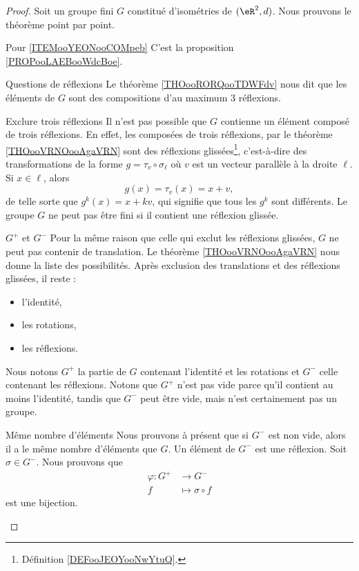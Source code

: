 \begin{proof}
	Soit un groupe fini \( G\) constitué d'isométries de \( (\eR^2,d)\). Nous prouvons le théorème point par point.
	\begin{subproof}
		\item[Pour \ref{ITEMooYEONooCOMpeb}]
		C'est la proposition \ref{PROPooLAEBooWdcBoe}.
		\item[Questions de réflexions]
		Le théorème \ref{THOooRORQooTDWFdv} nous dit que les éléments de \( G\) sont des compositions d'au maximum \( 3\) réflexions.
		\item[Exclure trois réflexions]
		Il n'est pas possible que \( G\) contienne un élément composé de trois réflexions. En effet, les composées de trois réflexions, par le théorème \ref{THOooVRNOooAgaVRN} sont des réflexions glissées\footnote{Définition \ref{DEFooJEOYooNwYtuQ}.}, c'est-à-dire des transformations de la forme \( g=\tau_v\circ \sigma_{\ell}\) où \( v\) est un vecteur parallèle à la droite \( \ell\). Si \( x\in \ell\), alors
		\begin{equation}
			g(x)=\tau_v(x)=x+v,
		\end{equation}
		de telle sorte que \( g^k(x)=x+kv\), qui signifie que tous les \( g^k\) sont différents. Le groupe \( G\) ne peut pas être fini si il contient une réflexion glissée.

		\item[\( G^+\) et \( G^-\)]
		Pour la même raison que celle qui exclut les réflexions glissées, \( G\) ne peut pas contenir de translation. Le théorème \ref{THOooVRNOooAgaVRN} nous donne la liste des possibilités. Après exclusion des translations et des réflexions glissées, il reste :
		\begin{itemize}
			\item l'identité,
			\item les rotations,
			\item les réflexions.
		\end{itemize}
		Nous notons \( G^+\) la partie de \( G\) contenant l'identité et les rotations et \( G^-\) celle contenant les réflexions. Notons que \( G^+\) n'est pas vide parce qu'il contient au moins l'identité, tandis que \( G^-\) peut être vide, mais n'est certainement pas un groupe.
		\item[Même nombre d'éléments]
		Nous prouvons à présent que si \( G^-\) est non vide, alors il a le même nombre d'éléments que \( G\). Un élément de \( G^-\) est une réflexion. Soit \( \sigma\in G^-\). Nous prouvons que
		\begin{equation}        \label{EQooWRVVooBQCtPg}
			\begin{aligned}
				\varphi\colon G^+ & \to G^-               \\
				f                 & \mapsto \sigma\circ f
			\end{aligned}
		\end{equation}
		est une bijection.


\end{subproof}
\end{proof}

